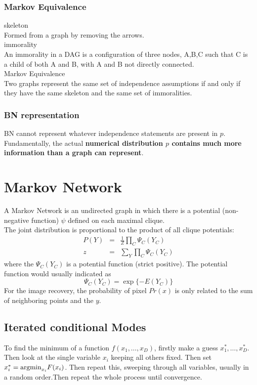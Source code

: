 \documentclass[12pt,a4paper]{article}
\begin{document}
\subsubsection*{Markov Equivalence}
{\large skeleton}\\
Formed from a graph by removing the arrows.\\
{\large immorality}\\
An immorality in a DAG is a configuration of three nodes, A,B,C such that C is a child of both A and B, with A and B not directly connected.\\
{\large Markov Equivalence}\\
Two graphs represent the same set of independence assumptions if and only if they have the same skeleton and the same set of immoralities.\\
\subsubsection*{BN representation}
BN cannot represent whatever independence statements are present in $p$.\\
Fundamentally, the actual \textbf{numerical distribution $p$ contains much more information than a graph can represent}.

\section*{Markov Network}
A Markov Network is an undirected graph in which there is a potential (non-negative function) $\psi$ defined on each maximal clique.\\
The joint distribution is proportional to the product of all clique potentials:
\begin{eqnarray*}
P(Y) &=& \frac{1}{Z}\prod_{C}\Psi_C(Y_C) \\
z &=& \sum_Y\prod_{C}\Psi_C(Y_C)
\end{eqnarray*}
where the $\Psi_C(Y_C)$ is a potential function (strict positive). The potential function would usually indicated as 
$$
\Psi_C(Y_C) = \exp\{-E(Y_C)\}
$$
For the image recovery, the probability of pixel $Pr(x)$ is only related to the  sum of neighboring points and the $y$.
\subsection*{Iterated conditional Modes}
To find the minimum of a function $f(x_1,\ldots,x_D)$, firstly make a guess $x_1^*,\ldots,x_D^*$. Then look at the single variable $x_i$ keeping all others fixed. Then set $x_i^*={\rm argmin}_{x_i}F(x_i)$.
Then repeat this, sweeping through all variables, usually in a random order.Then repeat the whole process until convergence.
\end{document}
